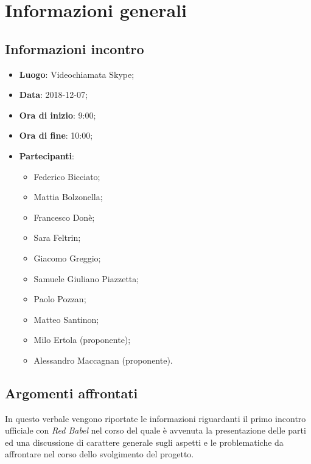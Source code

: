 \section{Informazioni generali}

\subsection{Informazioni incontro}
\begin{itemize}
\item \textbf{Luogo}: Videochiamata Skype;
\item \textbf{Data}: 2018-12-07;
\item \textbf{Ora di inizio}: 9:00;
\item \textbf{Ora di fine}: 10:00;
\item \textbf{Partecipanti}: 
	\begin{itemize}
		\item Federico Bicciato;
		\item Mattia Bolzonella;
		\item Francesco Donè;
		\item Sara Feltrin;
		\item Giacomo Greggio;
		\item Samuele Giuliano Piazzetta;
		\item Paolo Pozzan;
		\item Matteo Santinon;
		\item Milo Ertola (proponente);
		\item Alessandro Maccagnan (proponente).
	\end{itemize}
\end{itemize}

\subsection{Argomenti affrontati}
In questo verbale vengono riportate le informazioni riguardanti il primo incontro 
ufficiale con \textit{Red Babel} nel corso del quale è avvenuta la presentazione 
delle parti ed una discussione di carattere generale sugli aspetti e le problematiche
da affrontare nel corso dello svolgimento del progetto.
